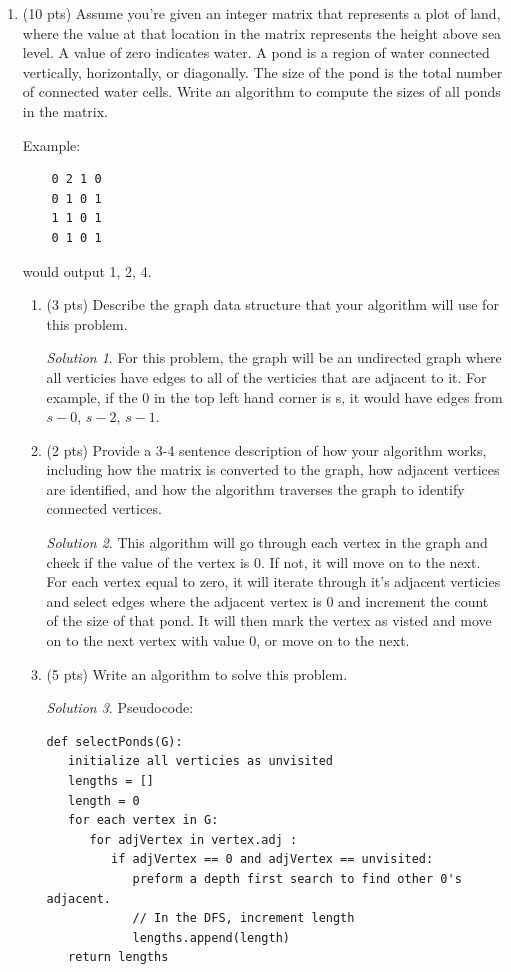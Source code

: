 \documentclass[12pt]{article}
\theoremstyle{remark}
\newtheorem*{solution}{Solution}
\begin{document}
\begin{enumerate}
\item (10 pts) Assume you're given an integer matrix that represents a plot of land, where the value at that location in the matrix represents the height above sea level. A value of zero indicates water. A pond is a region of water connected vertically, horizontally, or diagonally. The size of the pond is the total number of connected water cells. Write an algorithm to compute the sizes of all ponds in the matrix.

Example:
\begin{verbatim}
    0 2 1 0
    0 1 0 1
    1 1 0 1
    0 1 0 1
\end{verbatim}

would output 1, 2, 4.
\begin{enumerate}
    \item (3 pts) Describe the graph data structure that your algorithm will use for this problem.
    
    \begin{solution}
For this problem, the graph will be an undirected graph where all verticies have edges to all of the verticies that are adjacent to it. For example, if the 0 in the top left hand corner is s, it would have edges from $s-0$, $s-2$, $s-1$. 
    \end{solution}
\pagebreak
    
    \item (2 pts) Provide a 3-4 sentence description of how your algorithm works, including how the matrix is converted to the graph, how adjacent vertices are identified, and how the algorithm traverses the graph to identify connected vertices.
    
    \begin{solution}
This algorithm will go through each vertex in the graph and check if the value of the vertex is 0. If not, it will move on to the next. For each vertex equal to zero, it will iterate through it's adjacent verticies and select edges where the adjacent vertex is 0 and increment the count of the size of that pond. It will then mark the vertex as visted and move on to the next vertex with value 0, or move on to the next.
    \end{solution}
    
    \item (5 pts) Write an algorithm to solve this problem. 
    
    \begin{solution}Pseudocode:
\begin{verbatim} 
def selectPonds(G):
   initialize all verticies as unvisited
   lengths = []
   length = 0
   for each vertex in G: 
      for adjVertex in vertex.adj :
         if adjVertex == 0 and adjVertex == unvisited:
            preform a depth first search to find other 0's adjacent.  
            // In the DFS, increment length
            lengths.append(length)
   return lengths
   
         
   
\end{verbatim}
    \end{solution}
    
\end{enumerate}


\end{enumerate}
\end{document}
